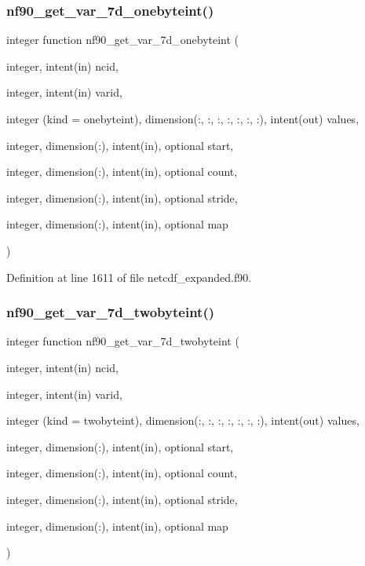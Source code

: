 \subsubsection{\texorpdfstring{nf90\+\_\+get\+\_\+var\+\_\+7d\+\_\+onebyteint()}{nf90\_get\_var\_7d\_onebyteint()}}
{\footnotesize\ttfamily integer function nf90\+\_\+get\+\_\+var\+\_\+7d\+\_\+onebyteint (\begin{DoxyParamCaption}\item[{integer, intent(in)}]{ncid,  }\item[{integer, intent(in)}]{varid,  }\item[{integer (kind = onebyteint), dimension(\+:, \+:, \+:, \+:, \+:, \+:, \+:), intent(out)}]{values,  }\item[{integer, dimension(\+:), intent(in), optional}]{start,  }\item[{integer, dimension(\+:), intent(in), optional}]{count,  }\item[{integer, dimension(\+:), intent(in), optional}]{stride,  }\item[{integer, dimension(\+:), intent(in), optional}]{map }\end{DoxyParamCaption})}



Definition at line 1611 of file netcdf\+\_\+expanded.\+f90.

\mbox{\label{netcdf__expanded_8f90_ac879ceaba40b8b12c68a9e4d904daa70}} 
\subsubsection{\texorpdfstring{nf90\+\_\+get\+\_\+var\+\_\+7d\+\_\+twobyteint()}{nf90\_get\_var\_7d\_twobyteint()}}
{\footnotesize\ttfamily integer function nf90\+\_\+get\+\_\+var\+\_\+7d\+\_\+twobyteint (\begin{DoxyParamCaption}\item[{integer, intent(in)}]{ncid,  }\item[{integer, intent(in)}]{varid,  }\item[{integer (kind = twobyteint), dimension(\+:, \+:, \+:, \+:, \+:, \+:, \+:), intent(out)}]{values,  }\item[{integer, dimension(\+:), intent(in), optional}]{start,  }\item[{integer, dimension(\+:), intent(in), optional}]{count,  }\item[{integer, dimension(\+:), intent(in), optional}]{stride,  }\item[{integer, dimension(\+:), intent(in), optional}]{map }\end{DoxyParamCaption})}



